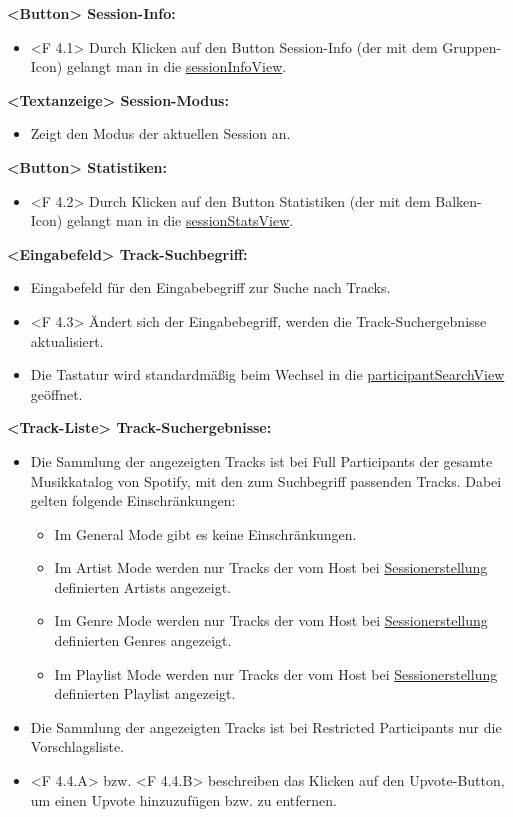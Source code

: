 \documentclass[oneside, ngerman]{sdqtechreport}
\begin{document}
\textbf{<Button> Session-Info:}
\begin{itemize}
    \item <F 4.1> Durch Klicken auf den Button Session-Info (der mit dem Gruppen-Icon) gelangt man in die \hyperlink{sessionInfoView}{sessionInfoView}.
\end{itemize}

\textbf{<Textanzeige> Session-Modus:}
\begin{itemize}
    \item Zeigt den Modus der aktuellen Session an.
\end{itemize}

\textbf{<Button> Statistiken:}
\begin{itemize}
    \item <F 4.2> Durch Klicken auf den Button Statistiken (der mit dem Balken-Icon) gelangt man in die \hyperlink{sessionStatsView}{sessionStatsView}.
\end{itemize}

\textbf{<Eingabefeld> Track-Suchbegriff:}
\begin{itemize}
    \item Eingabefeld für den Eingabebegriff zur Suche nach Tracks.
    \item <F 4.3> Ändert sich der Eingabebegriff, werden die Track-Suchergebnisse aktualisiert.
    \item Die Tastatur wird standardmäßig beim Wechsel in die \hyperlink{participantSearchView}{participantSearchView} geöffnet.
\end{itemize}

\textbf{<Track-Liste> Track-Suchergebnisse:}
\begin{itemize}
    \item Die Sammlung der angezeigten Tracks ist bei Full Participants der gesamte Musikkatalog von Spotify, mit den zum Suchbegriff passenden Tracks. Dabei gelten folgende Einschränkungen:
    \begin{itemize}
        \item Im General Mode gibt es keine Einschränkungen.
        \item Im Artist Mode werden nur Tracks der vom Host bei \hyperlink{hostModeSettingsView}{Sessionerstellung} definierten Artists angezeigt.
        \item Im Genre Mode werden nur Tracks der vom Host bei \hyperlink{hostModeSettingsView}{Sessionerstellung} definierten Genres angezeigt.
        \item Im Playlist Mode werden nur Tracks der vom Host bei \hyperlink{hostModeSettingsView}{Sessionerstellung} definierten Playlist angezeigt.
    \end{itemize}
    \item Die Sammlung der angezeigten Tracks ist bei Restricted Participants nur die Vorschlagsliste.
    \item <F 4.4.A> bzw. <F 4.4.B> beschreiben das Klicken auf den Upvote-Button, um einen Upvote hinzuzufügen bzw. zu entfernen.
\end{itemize}
\end{document}

